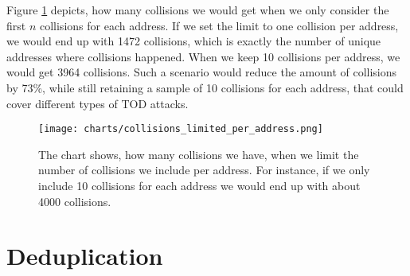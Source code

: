 \documentclass[draft,final]{vutinfth} %
\begin{document}
Figure \ref{fig:collsions_address_limit} depicts, how many collisions we would get when we only consider the first $n$ collisions for each address. If we set the limit to one collision per address, we would end up with 1472 collisions, which is exactly the number of unique addresses where collisions happened. When we keep 10 collisions per address, we would get 3964 collisions. Such a scenario would reduce the amount of collisions by 73\%, while still retaining a sample of 10 collisions for each address, that could cover different types of TOD attacks.

\begin{figure}[h]
    \centering
    \texttt{[image: charts/collisions\_limited\_per\_address.png]}
    \caption[Limit for collisions per address]{The chart shows, how many collisions we have, when we limit the number of collisions we include per address. For instance, if we only include 10 collisions for each address we would end up with about 4000 collisions.}
    \label{fig:collsions_address_limit}
\end{figure}

\section{Deduplication}


\iffalse
    We want a diverse set of attacks for the benchmark, so we filter out similar attacks to the ones we already analyzed. For instance, it does not make sense to analyze 5000 attacks for the USDT Stablecoin, as these will mostly collide.

    If possible, we don't need the traces analyzer for deduplication. For instance, maybe we can get all the necessary information from the default RPC tracers.
    Alternatively, we could also download all necessary data, and then loop through the traces analyzer and only pick the relevant (deduplicated) potential attacks.

    Ideas, potentially a mixture of those:

    \begin{enumerate}
        \item only trace some attacks per contract
        \item only trace some attacks per function
        \item only trace some attacks per group of vulnerable contracts (as defined by analysis)
        \item only trace some attacks per contract/function skeletons
        \item similar to \cite{}, analyze at how many attacks per contract/function the number of found attacks saturate (based on the analysis result)
    \end{enumerate}
\fi
\end{document}
